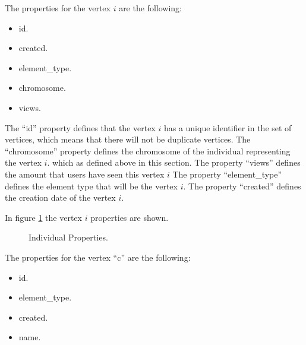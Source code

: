 \documentclass[conference]{IEEEtran}
\begin{document}
The properties for the vertex $i$ are the following:
\begin{itemize} 
\item id. 
\item created. 
\item element\_type.
\item chromosome.
\item views.
\end{itemize}

The “id” property defines that the vertex $i$ has a unique identifier in the set
of vertices, which means that there will not be duplicate vertices. The
“chromosome” property defines the chromosome of the individual representing the
vertex $i$. which as defined above in this section. The  property “views” defines
the amount that users have seen this vertex $i$ The property “element\_type”
defines the element type that will be the vertex $i$. The property “created”
defines the creation date of the vertex $i$. %


In figure \ref{fig:Individual_node} the vertex $i$ properties are shown.

\begin{figure}
\captionsetup{justification=centering,margin=2cm}
\centering
\setlength\fboxsep{0pt}
\setlength\fboxrule{0.7pt}
\caption{Individual Properties.}
\label{fig:Individual_node}       
\end{figure}

The properties for the vertex “c” are the following:

\begin{itemize} 
\item id. 
\item element\_type.
\item created. 
\item name.
\end{itemize}
\end{document}

